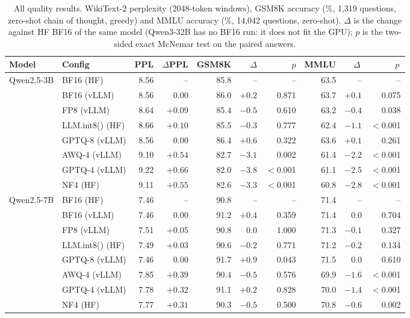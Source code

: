 \begin{table}[htbp]
\centering
\footnotesize
\caption{All quality results. WikiText-2 perplexity (2048-token windows), GSM8K accuracy (\%, 1,319 questions, zero-shot chain of thought, greedy) and MMLU accuracy (\%, 14,042 questions, zero-shot). $\Delta$ is the change against HF BF16 of the same model (Qwen3-32B has no BF16 run: it does not fit the GPU); $p$ is the two-sided exact McNemar test on the paired answers.}
\label{tab:quality}
\setlength{\tabcolsep}{4pt}
\begin{tabular}{llrrrrrrrr}
\toprule
Model & Config & PPL & $\Delta$PPL & GSM8K & $\Delta$ & $p$ & MMLU & $\Delta$\, & $p$\, \\
\midrule
Qwen2.5-3B & BF16 (HF) & 8.56 & -- & 85.8 & -- & -- & 63.5 & -- & -- \\
 & BF16 (vLLM) & 8.56 & $0.00$ & 86.0 & $+0.2$ & 0.871 & 63.7 & $+0.1$ & 0.075 \\
 & FP8 (vLLM) & 8.64 & $+0.09$ & 85.4 & $-0.5$ & 0.610 & 63.2 & $-0.4$ & 0.038 \\
 & LLM.int8() (HF) & 8.66 & $+0.10$ & 85.5 & $-0.3$ & 0.777 & 62.4 & $-1.1$ & $<$0.001 \\
 & GPTQ-8 (vLLM) & 8.56 & $0.00$ & 86.4 & $+0.6$ & 0.322 & 63.6 & $+0.1$ & 0.261 \\
 & AWQ-4 (vLLM) & 9.10 & $+0.54$ & 82.7 & $-3.1$ & 0.002 & 61.4 & $-2.2$ & $<$0.001 \\
 & GPTQ-4 (vLLM) & 9.22 & $+0.66$ & 82.0 & $-3.8$ & $<$0.001 & 61.1 & $-2.5$ & $<$0.001 \\
 & NF4 (HF) & 9.11 & $+0.55$ & 82.6 & $-3.3$ & $<$0.001 & 60.8 & $-2.8$ & $<$0.001 \\
Qwen2.5-7B & BF16 (HF) & 7.46 & -- & 90.8 & -- & -- & 71.4 & -- & -- \\
 & BF16 (vLLM) & 7.46 & $0.00$ & 91.2 & $+0.4$ & 0.359 & 71.4 & $0.0$ & 0.704 \\
 & FP8 (vLLM) & 7.51 & $+0.05$ & 90.8 & $0.0$ & 1.000 & 71.3 & $-0.1$ & 0.327 \\
 & LLM.int8() (HF) & 7.49 & $+0.03$ & 90.6 & $-0.2$ & 0.771 & 71.2 & $-0.2$ & 0.134 \\
 & GPTQ-8 (vLLM) & 7.46 & $0.00$ & 91.7 & $+0.9$ & 0.043 & 71.5 & $0.0$ & 0.610 \\
 & AWQ-4 (vLLM) & 7.85 & $+0.39$ & 90.4 & $-0.5$ & 0.576 & 69.9 & $-1.6$ & $<$0.001 \\
 & GPTQ-4 (vLLM) & 7.78 & $+0.32$ & 91.1 & $+0.2$ & 0.828 & 70.0 & $-1.4$ & $<$0.001 \\
 & NF4 (HF) & 7.77 & $+0.31$ & 90.3 & $-0.5$ & 0.500 & 70.8 & $-0.6$ & 0.002 \\

\end{tabular}
\end{table}
